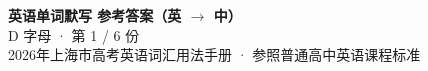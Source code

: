 \documentclass[10pt,a4paper]{article}
\begin{document}
\pagestyle{plain}

\begin{center}
{\LARGE\bfseries 英语单词默写 \quad 参考答案（英 $\to$ 中）}\\[0.22em]
{\large D 字母 · 第 1 / 6 份}\\[0.18em]
{\small 2026年上海市高考英语词汇用法手册 · 参照普通高中英语课程标准}
\end{center}

\vspace{0.2em}
\noindent{\color{rulegray}\rule{\textwidth}{0.8pt}}

\vspace{0.35em}

\vspace{0.25em}
\renewcommand{\arraystretch}{1.32}
\end{document}

